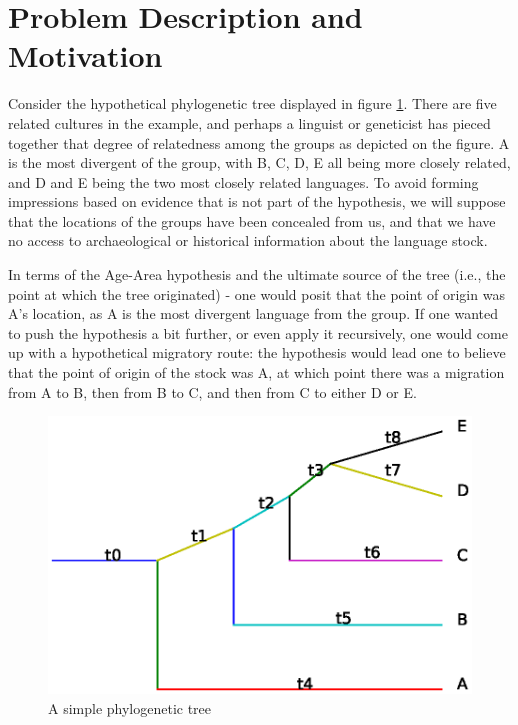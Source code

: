 \documentclass[11pt]{article}
\begin{document}
\section{Problem Description and Motivation}

Consider the hypothetical phylogenetic tree displayed in figure \ref{fig1}. There are five related cultures in the example, and perhaps a linguist or geneticist has pieced together that degree of relatedness among the groups as depicted on the figure. A is the most divergent of the group, with B, C, D, E all being more closely related, and D and E being the two most closely
related languages. To avoid forming impressions based on evidence that is not part of the hypothesis, we will suppose that the locations of the
groups have been concealed from us, and that we have no access to archaeological or historical information about the language stock.

In terms of the Age-Area hypothesis and the ultimate source of the tree (i.e., the point at which the tree originated) - one would posit that the point of origin was A's location, as A is the most divergent language from the group. If one wanted to push the hypothesis a bit further, or even apply it recursively, one would come up with a hypothetical migratory route: the hypothesis would lead one to believe that the point of origin of the stock was A, at which point there was a migration from A to B, then from B to C, and then from C to either D or E.

\begin{figure}
\begin{center}
\includegraphics[width=\textwidth]{simplePT.eps}
\caption{A simple phylogenetic tree}
\end{center} \label{fig1}
\end{figure}
\end{document}
